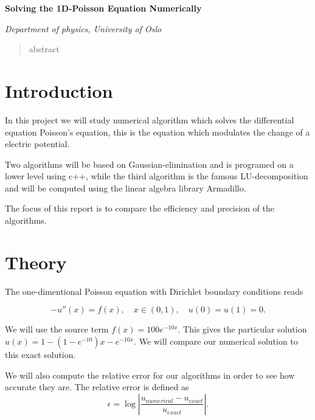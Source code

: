 \documentclass[10pt]{article}
\begin{document}
\begin{center}
  \large \textbf{Solving the 1D-Poisson Equation Numerically}

  
  \textit{Department of physics, University of Oslo}


\end{center}
\begin{abstract}
  abstract 


\end{abstract}
\section{Introduction}
In this project we will study numerical algorithm which solves the differential equation Poisson's equation, this is the equation which modulates the change of a electric potential. 

Two algorithms will be based on Gaussian-elimination and is programed on a lower level using c++, while the third algorithm is the famous LU-decomposition and will be computed using the linear algebra library Armadillo.

The focus of this report is to compare the efficiency and precision of the algorithms.

\section{Theory}
The one-dimentional Poisson equation 
with Dirichlet boundary conditions reads 

\begin{equation*}
 -u''(x)=f(x),\quad x\in (0,1),\quad u(0)=u(1)=0.
\end{equation*}

We will use the source term $f(x)=100e^{-10x}$. This gives the particular solution 
$u(x)=1-(1-e^{-10})x-e^{-10x}$. We will compare our numerical solution to this exact solution.

We will also compute the relative error for our algorithms in order to see how accurate they are. The relative error is defined as 
$$ \epsilon=\log{\left|\frac{u_{numerical}-u_{exact}}{u_{exact}}\right|}.$$
\end{document}
